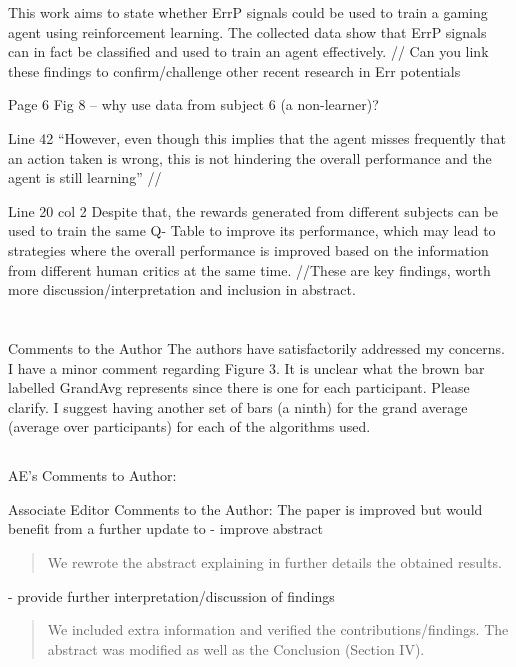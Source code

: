 \documentclass[journal,onecolumn,12pt]{IEEEtran}
\begin{document}
This work aims to state whether ErrP signals could be used to train a gaming agent using reinforcement learning. The collected data show that ErrP signals can in fact be classified and used to train an agent effectively. // Can you link these findings to confirm/challenge other recent research in Err potentials


Page 6
Fig 8 – why use data from subject 6 (a non-learner)?


Line 42 “However, even though this implies that the agent misses frequently that an action taken is wrong, this is not hindering the overall performance and the agent is still learning” //


Line 20 col 2 Despite that, the rewards generated from different subjects can be used to train the same Q- Table to improve its performance, which may lead to strategies where the overall performance is improved based on the information from different human critics at the same time.
//These are key findings, worth more discussion/interpretation and inclusion in abstract.



\section*{}

Comments to the Author
The authors have satisfactorily addressed my concerns. I have a minor comment regarding Figure 3. It is unclear what the brown bar labelled GrandAvg represents since there is one for each participant. Please clarify. I suggest having another set of bars (a ninth) for the grand average (average over participants) for each of the algorithms used.


\subsection*{}
AE's Comments to Author:

Associate Editor
Comments to the Author:
The paper is improved but would benefit from a further update to
- improve abstract

\begin{quotation}
{\color{blue}
We rewrote the abstract explaining in further details the obtained results.  
}
\end{quotation}


- provide further interpretation/discussion of findings

\begin{quotation}
{\color{blue}
We included extra information and verified the contributions/findings.  The abstract was modified as well as the Conclusion (Section IV).
}
\end{quotation}
\end{document}
